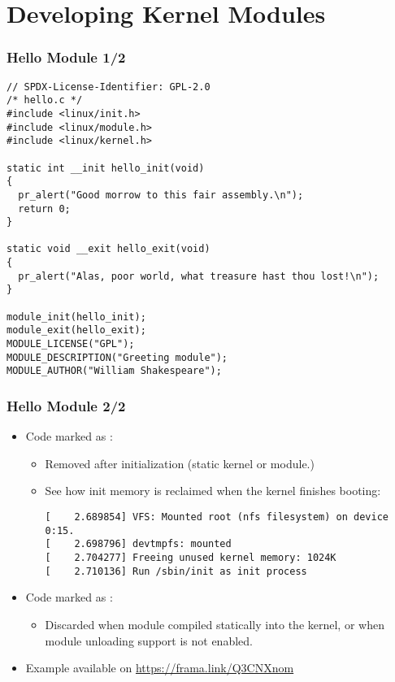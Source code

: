 \section{Developing Kernel Modules}

\begin{frame}[fragile]
  \frametitle{Hello Module 1/2}
\begin{verbatim}
// SPDX-License-Identifier: GPL-2.0
/* hello.c */
#include <linux/init.h>
#include <linux/module.h>
#include <linux/kernel.h>

static int __init hello_init(void)
{
  pr_alert("Good morrow to this fair assembly.\n");
  return 0;
}

static void __exit hello_exit(void)
{
  pr_alert("Alas, poor world, what treasure hast thou lost!\n");
}

module_init(hello_init);
module_exit(hello_exit);
MODULE_LICENSE("GPL");
MODULE_DESCRIPTION("Greeting module");
MODULE_AUTHOR("William Shakespeare");
\end{verbatim}
\end{frame}

\begin{frame}[fragile]
  \frametitle{Hello Module 2/2}
\begin{itemize}
\item Code marked as :
  \begin{itemize}
  \item Removed after initialization (static kernel or module.)
  \item See how init memory is reclaimed when the kernel finishes booting:
  \begin{verbatim}
[    2.689854] VFS: Mounted root (nfs filesystem) on device 0:15.
[    2.698796] devtmpfs: mounted
[    2.704277] Freeing unused kernel memory: 1024K
[    2.710136] Run /sbin/init as init process
  \end{verbatim}
  \end{itemize}
\item Code marked as :
  \begin{itemize}
  \item Discarded when module compiled statically into the kernel,
        or when module unloading support is not enabled.
  \end{itemize}
\item Example available on \url{https://frama.link/Q3CNXnom}
\end{itemize}
\end{frame}

